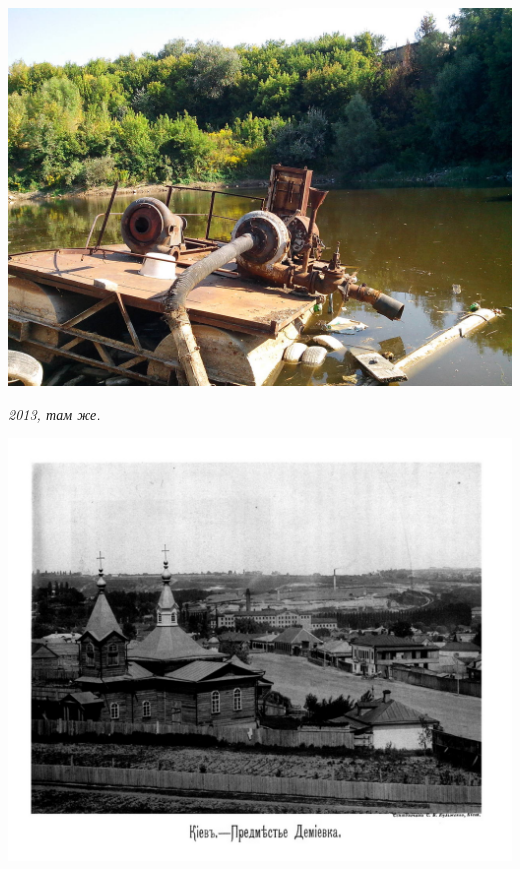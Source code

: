 \begin{center}
\includegraphics[width=\linewidth]{pix/s-syrec-IMG_20130812_164051.jpg}

\textit{2013, там же.}
\end{center} 

\newpage
\vspace*{\fill}
\begin{center}
\includegraphics[width=\linewidth]{pix/24.jpeg}
\end{center} 

